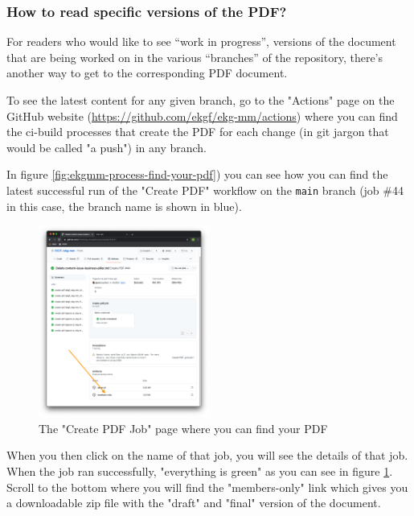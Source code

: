 \subsubsection{How to read specific versions of the PDF?}

For readers who would like to see “work in progress”, versions of the document 
that are being worked on in the various “branches” of the repository, 
there’s another way to get to the corresponding PDF document.

To see the latest content for any given branch, go to the "Actions" page 
on the GitHub website (\url{https://github.com/ekgf/ekg-mm/actions}) where you can 
find the \gls{ci}-build processes that create the PDF for each change 
(in git jargon that would be called "a push") in any branch.

In figure \ref{fig:ekgmm-process-find-your-pdf}) you can see how you can 
find the latest successful run of the "Create PDF" workflow on the 
\texttt{main} branch (job \#44 in this case, the branch name is shown in blue).

%
%
\begin{figure}
    \vspace{-12pt}
    \begin{center}
        \includegraphics[width=0.50\textwidth]{../images/ekgmm-process-create-pdf-job.png}
    \end{center}
    \caption{The "Create PDF Job" page where you can find your PDF}
    \label{fig:ekgmm-process-create-pdf-job}
\end{figure}

When you then click on the name of that job, you will see the details of that job.
When the job ran successfully, "everything is green" as you can see in figure
\ref{fig:ekgmm-process-create-pdf-job}.
Scroll to the bottom where you will find the "members-only" link which gives you
a downloadable zip file with the "draft" and "final" version of the document.

